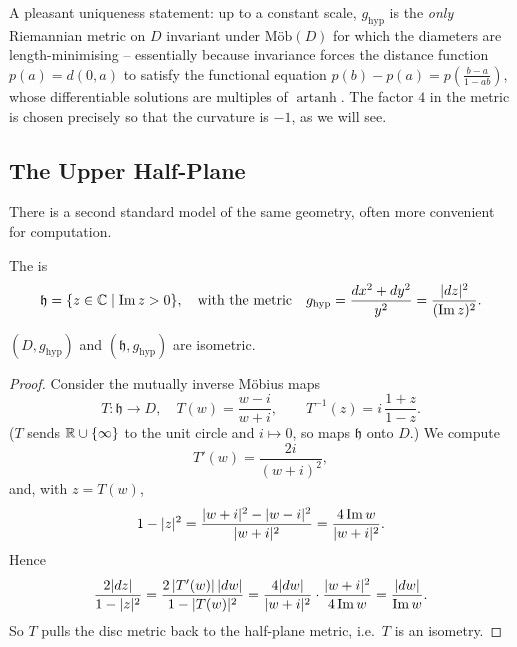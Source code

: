 \documentclass[a4paper]{scrartcl}
\newcommand{\Mob}{\text{M\"ob}}
\DeclareMathOperator{\artanh}{artanh}
\begin{document}
\begin{remark}
    A pleasant uniqueness statement: up to a constant scale, $g_{\mathrm{hyp}}$ is the \emph{only} Riemannian metric on $D$ invariant under $\Mob(D)$ for which the diameters are length-minimising -- essentially because invariance forces the distance function $p(a) = d(0, a)$ to satisfy the functional equation $p(b) - p(a) = p\left(\frac{b - a}{1 - ab}\right)$, whose differentiable solutions are multiples of $\artanh$. The factor $4$ in the metric is chosen precisely so that the curvature is $-1$, as we will see.
\end{remark}

\subsection{The Upper Half-Plane}

There is a second standard model of the same geometry, often more convenient for computation.

\begin{definition}
    The  is
    $$
    \mathfrak{h} = \{z \in \mathbb{C} \mid \operatorname{Im} z > 0\}, \quad \text{with the metric} \quad g_{\mathrm{hyp}} = \frac{dx^2 + dy^2}{y^2} = \frac{|dz|^2}{(\operatorname{Im} z)^2}.
    $$
\end{definition}

\begin{lemma}
    $(D, g_{\mathrm{hyp}})$ and $(\mathfrak{h}, g_{\mathrm{hyp}})$ are isometric.
\end{lemma}
\begin{proof}
    Consider the mutually inverse M\"obius maps
    $$
    T: \mathfrak{h} \rightarrow D, \quad T(w) = \frac{w - i}{w + i}, \qquad T^{-1}(z) = i\,\frac{1 + z}{1 - z}.
    $$
    ($T$ sends $\mathbb{R} \cup \{\infty\}$ to the unit circle and $i \mapsto 0$, so maps $\mathfrak{h}$ onto $D$.) We compute
    $$
    T'(w) = \frac{2i}{(w + i)^2},
    $$
    and, with $z = T(w)$,
    $$
    1 - |z|^2 = \frac{|w + i|^2 - |w - i|^2}{|w+i|^2} = \frac{4 \operatorname{Im} w}{|w + i|^2}.
    $$
    Hence
    $$
    \frac{2|dz|}{1 - |z|^2} = \frac{2\,|T'(w)|\,|dw|}{1 - |T(w)|^2} = \frac{4 |dw|}{|w+i|^2} \cdot \frac{|w+i|^2}{4 \operatorname{Im} w} = \frac{|dw|}{\operatorname{Im} w}.
    $$
    So $T$ pulls the disc metric back to the half-plane metric, i.e.\ $T$ is an isometry.
\end{proof}
\end{document}
